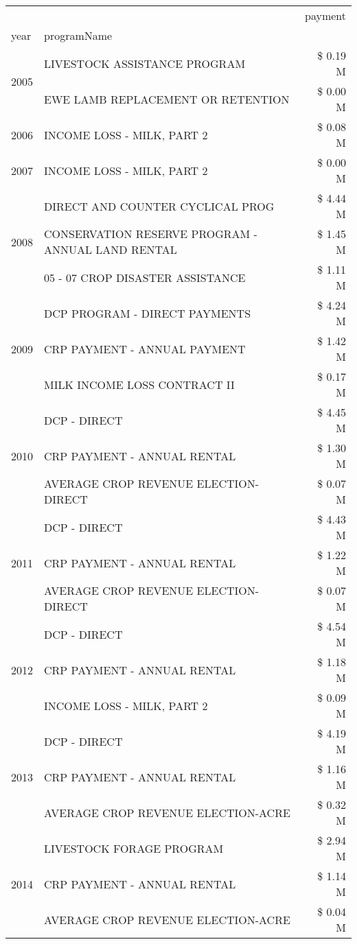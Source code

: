 \begin{tabular}{llr}
\toprule
 &  & payment \\
year & programName &  \\
\midrule
\multirow[t]{2}{*}{2005} & LIVESTOCK ASSISTANCE PROGRAM & \$ 0.19 M \\
 & EWE LAMB REPLACEMENT OR RETENTION & \$ 0.00 M \\
\cline{1-3}
2006 & INCOME LOSS - MILK, PART 2 & \$ 0.08 M \\
\cline{1-3}
2007 & INCOME LOSS - MILK, PART 2 & \$ 0.00 M \\
\cline{1-3}
\multirow[t]{3}{*}{2008} & DIRECT AND COUNTER CYCLICAL PROG & \$ 4.44 M \\
 & CONSERVATION RESERVE PROGRAM - ANNUAL LAND RENTAL & \$ 1.45 M \\
 & 05 - 07 CROP DISASTER ASSISTANCE & \$ 1.11 M \\
\cline{1-3}
\multirow[t]{3}{*}{2009} & DCP PROGRAM - DIRECT PAYMENTS & \$ 4.24 M \\
 & CRP PAYMENT - ANNUAL PAYMENT & \$ 1.42 M \\
 & MILK INCOME LOSS CONTRACT II & \$ 0.17 M \\
\cline{1-3}
\multirow[t]{3}{*}{2010} & DCP - DIRECT & \$ 4.45 M \\
 & CRP PAYMENT - ANNUAL RENTAL & \$ 1.30 M \\
 & AVERAGE CROP REVENUE ELECTION-DIRECT & \$ 0.07 M \\
\cline{1-3}
\multirow[t]{3}{*}{2011} & DCP - DIRECT & \$ 4.43 M \\
 & CRP PAYMENT - ANNUAL RENTAL & \$ 1.22 M \\
 & AVERAGE CROP REVENUE ELECTION-DIRECT & \$ 0.07 M \\
\cline{1-3}
\multirow[t]{3}{*}{2012} & DCP - DIRECT & \$ 4.54 M \\
 & CRP PAYMENT - ANNUAL RENTAL & \$ 1.18 M \\
 & INCOME LOSS - MILK, PART 2 & \$ 0.09 M \\
\cline{1-3}
\multirow[t]{3}{*}{2013} & DCP - DIRECT & \$ 4.19 M \\
 & CRP PAYMENT - ANNUAL RENTAL & \$ 1.16 M \\
 & AVERAGE CROP REVENUE ELECTION-ACRE & \$ 0.32 M \\
\cline{1-3}
\multirow[t]{3}{*}{2014} & LIVESTOCK FORAGE PROGRAM & \$ 2.94 M \\
 & CRP PAYMENT - ANNUAL RENTAL & \$ 1.14 M \\
 & AVERAGE CROP REVENUE ELECTION-ACRE & \$ 0.04 M \\

\end{tabular}
